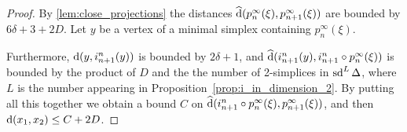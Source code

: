 \documentclass[a4paper]{article}
\begin{document}
\begin{proof}
  By \cref{lem:close_projections} the distances $\operatorname{\widehat{d}}(p^\infty_n(\xi),
  p^\infty_{n+1}(\xi))$ are bounded by $6\delta + 3 + 2D$. Let $y$ be a vertex
  of a minimal simplex containing $p^\infty_n(\xi)$.
  
  Furthermore, $\operatorname{d}(y, i^n_{n+1}(y))$ is bounded by $2\delta+1$, and
  $\operatorname{\widehat{d}}(i^n_{n+1}(y), i^n_{n+1}\circ p^\infty_n (\xi))$ is bounded by
  the product of $D$ and the the number of 2-simplices in $\operatorname{sd}^L\Delta$, where
  $L$ is the number appearing in Proposition~\ref{prop:i_in_dimension_2}.  By
  putting all this together we obtain a bound $C$ on
  $\operatorname{\widehat{d}}(i^n_{n+1}\circ p^\infty_n(\xi), p^\infty_{n+1}(\xi))$, and then
  $\operatorname{d}(x_1, x_2) \leq C + 2D$.
\end{proof}
\end{document}
